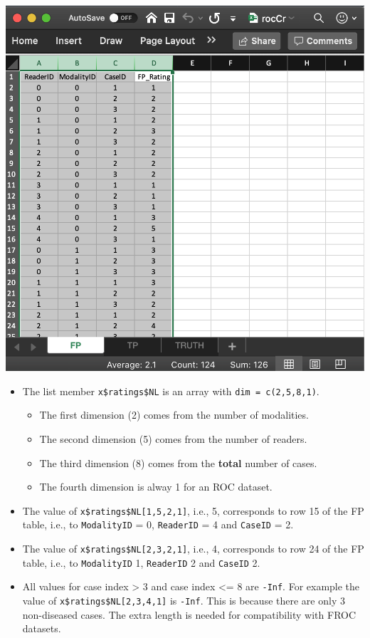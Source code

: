 \documentclass[
]{book}
\providecommand{\tightlist}{%
  \setlength{\itemsep}{0pt}\setlength{\parskip}{0pt}}
\begin{document}
\includegraphics[width=1\textwidth,height=\textheight]{images/quick-start/rocCrFp.png}

\begin{itemize}
\tightlist
\item
  The list member \texttt{x\$ratings\$NL} is an array with \texttt{dim\ =\ c(2,5,8,1)}.

  \begin{itemize}
  \tightlist
  \item
    The first dimension (2) comes from the number of modalities.
  \item
    The second dimension (5) comes from the number of readers.
  \item
    The third dimension (8) comes from the \textbf{total} number of cases.
  \item
    The fourth dimension is alway 1 for an ROC dataset.
  \end{itemize}
\item
  The value of \texttt{x\$ratings\$NL{[}1,5,2,1{]}}, i.e., 5, corresponds to row 15 of the FP table, i.e., to \texttt{ModalityID} = 0, \texttt{ReaderID} = 4 and \texttt{CaseID} = 2.
\item
  The value of \texttt{x\$ratings\$NL{[}2,3,2,1{]}}, i.e., 4, corresponds to row 24 of the FP table, i.e., to \texttt{ModalityID} 1, \texttt{ReaderID} 2 and \texttt{CaseID} 2.
\item
  All values for case index \textgreater{} 3 and case index \textless= 8 are \texttt{-Inf}. For example the value of \texttt{x\$ratings\$NL{[}2,3,4,1{]}} is \texttt{-Inf}. This is because there are only 3 non-diseased cases. The extra length is needed for compatibility with FROC datasets.
\end{itemize}
\end{document}

